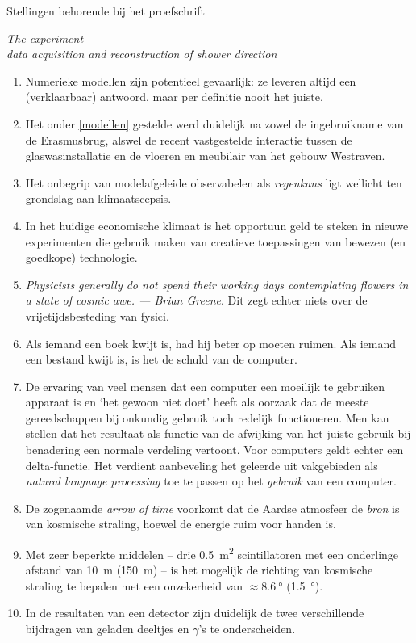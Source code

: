 \documentclass{article}
\newcommand{\hisparc}{\textsmaller{HiSPARC}\xspace}
\begin{document}
\noindent
Stellingen behorende bij het proefschrift

\vfill

\begin{center}
\larger
\emph{The \hisparc experiment\\data acquisition and reconstruction of
shower direction}
\end{center}

\vfill

\begin{enumerate}[I]
\item \label{modellen} Numerieke modellen zijn potentieel gevaarlijk: ze
leveren altijd een (verklaarbaar) antwoord, maar per definitie nooit het
juiste.
\item Het onder \ref{modellen} gestelde werd duidelijk na zowel de
ingebruikname van de Erasmusbrug, alswel de recent vastgestelde interactie
tussen de glaswasinstallatie en de vloeren en meubilair van het gebouw
Westraven.
\item Het onbegrip van modelafgeleide observabelen als \emph{regenkans}
ligt wellicht ten grondslag aan klimaatscepsis.
\item In het huidige economische klimaat is het opportuun geld te steken
in nieuwe experimenten die gebruik maken van creatieve toepassingen van
bewezen (en goedkope) technologie.
\item \emph{Physicists generally do not spend their working days
contemplating flowers in a state of cosmic awe. --- Brian Greene}.  Dit
zegt echter niets over de vrijetijdsbesteding van fysici.
\item Als iemand een boek kwijt is, had hij beter op moeten ruimen.  Als
iemand een bestand kwijt is, is het de schuld van de computer.
\item De ervaring van veel mensen dat een computer een moeilijk te
gebruiken apparaat is en `het gewoon niet doet' heeft als oorzaak dat de
meeste gereedschappen bij onkundig gebruik toch redelijk functioneren.
Men kan stellen dat het resultaat als functie van de afwijking van het
juiste gebruik bij benadering een normale verdeling vertoont.  Voor
computers geldt echter een delta-functie.  Het verdient aanbeveling het
geleerde uit vakgebieden als \emph{natural language processing} toe te
passen op het \emph{gebruik} van een computer.
\item De zogenaamde \emph{arrow of time} voorkomt dat de Aardse atmosfeer
de \emph{bron} is van kosmische straling, hoewel de energie ruim voor
handen is.
\item Met zeer beperkte middelen -- drie \SI{0.5}{\square\meter}
scintillatoren met een onderlinge afstand van \SI{10}{\meter}
(\SI{150}{\meter}) -- is het mogelijk de richting van kosmische straling
te bepalen met een onzekerheid van $\approx \SI{8.6}{\degree}$
(\SI{1.5}{\degree}).
\item In de resultaten van een \hisparc detector zijn duidelijk de twee
verschillende bijdragen van geladen deeltjes en $\gamma$'s te
onderscheiden.
\end{enumerate}
\end{document}

